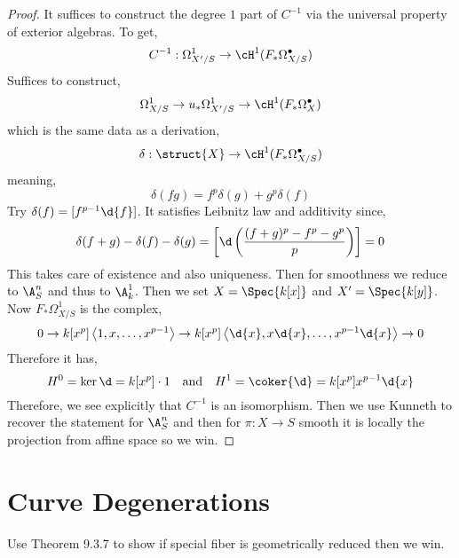 \documentclass[12pt]{article}
\begin{document}
\begin{proof}
It suffices to construct the degree $1$ part of $C^{-1}$ via the universal property of exterior algebras. To get,
\[ C^{-1} : \Omega^1_{X'/S} \to \cH^1(F_* \Omega^\bullet_{X/S}) \]
Suffices to construct,
\[ \Omega_{X/S}^1 \to u_* \Omega_{X'/S}^1 \to \cH^1(F_* \Omega_X^\bullet) \]
which is the same data as a derivation,
\[ \delta : \struct{X} \to \cH^1(F_* \Omega_{X/S}^\bullet) \]
meaning,
\[ \delta(fg) = f^p \delta(g) + g^p \delta(f) \]
Try $\delta(f) = [f^{p-1} \d{f}]$. It satisfies Leibnitz law and additivity since,
\[ \delta(f+g) - \delta(f) - \delta(g) = \left[ \d \left( \frac{(f+g)^p - f^p - g^p}{p} \right) \right] = 0 \]
This takes care of existence and also uniqueness. Then for smoothness we reduce to $\A^n_S$ and thus to $\A^1_{k}$. Then we set $X = \Spec{k[x]}$ and $X' = \Spec{k[y]}$. Now $F_* \Omega^1_{X/S}$ is the complex,
\[ 0 \to k[x^p] \left< 1, x, \dots, x^{p-1} \right> \to k[x^p] \left< \d{x}, x \d{x}, \dots, x^{p-1} \d{x} \right> \to 0 \]
Therefore it has,
\[ H^0 = \ker{\d} = k[x^p] \cdot 1 \quad \text{and} \quad H^1 = \coker{\d} = k[x^p] x^{p-1} \d{x} \]
Therefore, we see explicitly that $C^{-1}$ is an isomorphism. Then we use Kunneth to recover the statement for $\A^n_S$ and then for $\pi : X \to S$ smooth it is \etale locally the projection from affine space so we win.
\end{proof}

\section{Curve Degenerations}

Use Theorem 9.3.7 to show if special fiber is geometrically reduced then we win.
\end{document}
